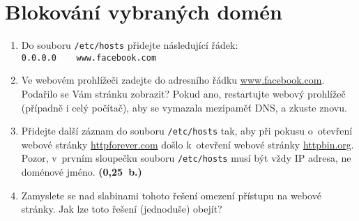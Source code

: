 \section{Blokování vybraných domén}
\begin{enumerate}
	\item Do souboru \texttt{/etc/hosts} přidejte následující řádek:\\
    \verb|0.0.0.0    www.facebook.com|
    \item Ve webovém prohlížeči zadejte do adresního řádku \url{www.facebook.com}. Podařilo se Vám stránku zobrazit? Pokud ano, restartujte webový prohlížeč (případně i celý počítač), aby se vymazala mezipaměť DNS, a zkuste znovu.
    \item Přidejte další záznam do souboru \texttt{/etc/hosts} tak, aby při pokusu o~otevření webové stránky \url{httpforever.com} došlo k~otevření webové stránky \url{httpbin.org}. Pozor, v~prvním sloupečku souboru \texttt{/etc/hosts} musí být vždy IP adresa, ne doménové jméno. \textbf{(0,25~b.)}
    \item Zamyslete se nad slabinami tohoto řešení omezení přístupu na webové stránky. Jak lze toto řešení (jednoduše) obejít?
\end{enumerate}

